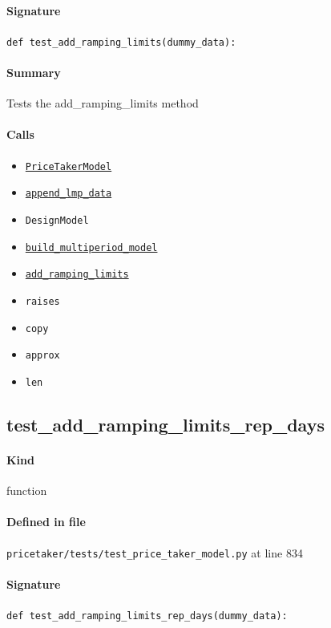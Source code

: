 \documentclass[11pt]{report}
\begin{document}
\paragraph{Signature} \texttt{def test\_add\_ramping\_limits(dummy\_data):}
\paragraph{Summary} Tests the add\_ramping\_limits method
\paragraph{Calls}
\begin{itemize}[leftmargin=*]
  \item \hyperref[def:pricetaker-price_taker_model.py:PriceTakerModel:L161]{\texttt{PriceTakerModel}}
  \item \hyperref[def:pricetaker-price_taker_model.py:PriceTakerModel.append_lmp_data:L221]{\texttt{append\_lmp\_data}}
  \item \texttt{DesignModel}
  \item \hyperref[def:pricetaker-price_taker_model.py:PriceTakerModel.build_multiperiod_model:L291]{\texttt{build\_multiperiod\_model}}
  \item \hyperref[def:pricetaker-price_taker_model.py:PriceTakerModel.add_ramping_limits:L723]{\texttt{add\_ramping\_limits}}
  \item \texttt{raises}
  \item \texttt{copy}
  \item \texttt{approx}
  \item \texttt{len}
\end{itemize}
\subsection{test\_add\_ramping\_limits\_rep\_days}
\label{def:pricetaker-tests-test_price_taker_model.py:test_add_ramping_limits_rep_days:L834}
\paragraph{Kind} function
\paragraph{Defined in file} \texttt{pricetaker/tests/test\_price\_taker\_model.py} at line 834
\paragraph{Signature} \texttt{def test\_add\_ramping\_limits\_rep\_days(dummy\_data):}
\end{document}
